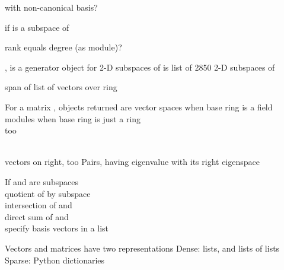 \documentclass[a4paper]{article}
\begin{document}
\begin{multicols*}{3}



with non-canonical basis?

 if  is a subspace of 

 rank equals degree (as module)?

,\quad{} \BreakLineAndIndent
{} is a generator object 
for 2-D subspaces of  \BreakLineAndIndent
\sagecommand{[U for U in T]} is list of 2850 2-D subspaces of 


 span of list of vectors over ring

For a matrix , objects returned are  \BreakLineAndIndent
vector spaces when base ring is a field \BreakLineAndIndent
 modules when base ring is just a ring       \\
 too                     \\
         \\

vectors on right,  too                  \BreakLineAndIndent
Pairs, having eigenvalue with its right eigenspace

If  and  are subspaces\\
 quotient of  by subspace \\
 intersection of  and \\
 direct sum of  and \\
 specify basis vectors in a list



Vectors and matrices have two representations \BreakLineAndIndent
Dense: lists, and lists of lists           \BreakLineAndIndent
Sparse: Python dictionaries


\end{multicols*}
\end{document}
